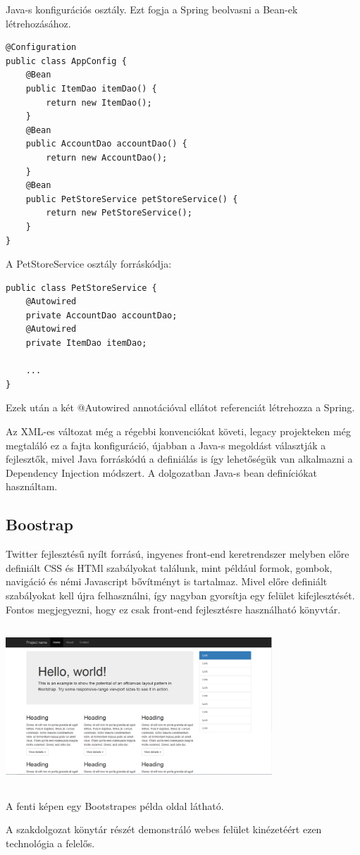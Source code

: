 \documentclass{article}
\begin{document}
Java-s konfigurációs osztály. Ezt fogja a Spring beolvasni a Bean-ek létrehozásához. 
\begin{lstlisting}
@Configuration
public class AppConfig {
	@Bean
	public ItemDao itemDao() {
		return new ItemDao();
	}
	@Bean
	public AccountDao accountDao() {
		return new AccountDao();
	}
	@Bean
	public PetStoreService petStoreService() {
		return new PetStoreService();
	}
}
\end{lstlisting}
A PetStoreService osztály forráskódja:
\begin{lstlisting}
public class PetStoreService {
	@Autowired
	private AccountDao accountDao;
	@Autowired
	private ItemDao itemDao;
	
	...
}
\end{lstlisting}
Ezek után a két @Autowired annotációval ellátot referenciát létrehozza a Spring.

Az XML-es változat még a régebbi konvenciókat követi, legacy projekteken még megtaláló ez a fajta konfiguráció, újabban a Java-s megoldást választják a fejlesztők, mivel Java forráskódú a definiálás is így lehetőségük van alkalmazni a Dependency Injection módszert. A dolgozatban Java-s bean definíciókat használtam.

\subsection{Boostrap}\label{subsec:boostrap}
Twitter fejlesztésű nyílt forrású, ingyenes front-end keretrendszer melyben előre definiált CSS és HTMl szabályokat találunk, mint például formok, gombok, navigáció és némi Javascript bővítményt is tartalmaz. Mivel előre definiált szabályokat kell újra felhasználni, így nagyban gyorsítja egy felület kifejlesztését. Fontos megjegyezni, hogy ez csak front-end fejlesztésre használható könyvtár. 

\begin{center}
	\includegraphics[width=10cm, height=6cm]{boostrap_example}
	
	A fenti képen egy Bootstrapes példa oldal látható.
\end{center}
	A szakdolgozat könytár részét demonstráló webes felület kinézetéért ezen technológia a felelős.
\end{document}
